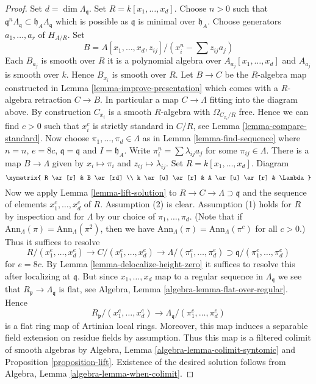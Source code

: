 \begin{proof}
Set $d = \dim \Lambda_\mathfrak q$. Set $R = k[x_1, \ldots, x_d]$.
Choose $n > 0$ such that
$\mathfrak q^n\Lambda_\mathfrak q \subset \mathfrak h_A\Lambda_\mathfrak q$
which is possible as $\mathfrak q$ is minimal over $\mathfrak h_A$.
Choose generators $a_1, \ldots, a_r$ of $H_{A/R}$. Set
$$
B = A[x_1, \ldots, x_d, z_{ij}]/(x_i^n - \sum z_{ij}a_j)
$$
Each $B_{a_j}$ is smooth over $R$ it is a polynomial
algebra over $A_{a_j}[x_1, \ldots, x_d]$ and $A_{a_j}$ is smooth over $k$.
Hence $B_{x_i}$ is smooth over $R$. Let $B \to C$ be the $R$-algebra
map constructed in Lemma \ref{lemma-improve-presentation}
which comes with a $R$-algebra retraction $C \to B$. In particular
a map $C \to \Lambda$ fitting into the diagram above.
By construction $C_{x_i}$ is a smooth $R$-algebra with
$\Omega_{C_{x_i}/R}$ free. Hence we can find $c > 0$
such that $x_i^c$ is strictly standard in $C/R$, see
Lemma \ref{lemma-compare-standard}.
Now choose $\pi_1, \ldots, \pi_d \in \Lambda$ as in
Lemma \ref{lemma-find-sequence}
where $n = n$, $e = 8c$, $\mathfrak q = \mathfrak q$ and $I = \mathfrak h_A$.
Write $\pi_i^n = \sum \lambda_{ij} a_j$ for some $\pi_{ij} \in \Lambda$.
There is a map $B \to \Lambda$ given by $x_i \mapsto \pi_i$
and $z_{ij} \mapsto \lambda_{ij}$. Set $R = k[x_1, \ldots, x_d]$.
Diagram
$$
\xymatrix{
R \ar[r] & B \ar[rd] \\
k \ar[u] \ar[r] & A \ar[u] \ar[r] & \Lambda
}
$$
Now we apply
Lemma \ref{lemma-lift-solution}
to $R \to C \to \Lambda \supset \mathfrak q$
and the sequence of elements $x_1^c, \ldots, x_d^c$ of $R$.
Assumption (2) is clear. Assumption (1) holds for $R$
by inspection and for $\Lambda$ by our choice of
$\pi_1, \ldots, \pi_d$. (Note that if
$\text{Ann}_\Lambda(\pi) = \text{Ann}_\Lambda(\pi^2)$, then we have
$\text{Ann}_\Lambda(\pi) = \text{Ann}_\Lambda(\pi^c)$ for all $c > 0$.)
Thus it suffices to resolve
$$
R/(x_1^e, \ldots, x_d^e) \to C/(x_1^e, \ldots, x_d^e) \to
\Lambda/(\pi_1^e, \ldots, \pi_d^e) \supset
\mathfrak q/(\pi_1^e, \ldots, \pi_d^e)
$$
for $e = 8c$. By
Lemma \ref{lemma-delocalize-height-zero}
it suffices to resolve this after localizing at $\mathfrak q$.
But since $x_1, \ldots, x_d$ map to a regular sequence
in $\Lambda_\mathfrak q$ we see that $R_\mathfrak p \to \Lambda_\mathfrak q$
is flat, see Algebra, Lemma \ref{algebra-lemma-flat-over-regular}. Hence
$$
R_\mathfrak p/(x_1^e, \ldots, x_d^e) \to
\Lambda_\mathfrak q/(\pi_1^e, \ldots, \pi_d^e)
$$
is a flat ring map of Artinian local rings.
Moreover, this map induces a separable field extension
on residue fields by assumption. Thus this map is a filtered colimit
of smooth algebras by
Algebra, Lemma \ref{algebra-lemma-colimit-syntomic}
and Proposition \ref{proposition-lift}.
Existence of the desired solution follows from
Algebra, Lemma \ref{algebra-lemma-when-colimit}.
\end{proof}






